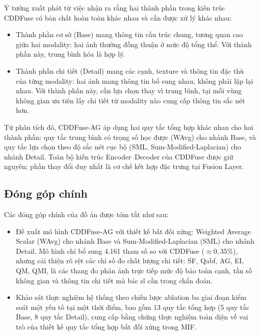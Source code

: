 Ý tưởng xuất phát từ việc nhận ra rằng hai thành phần trong kiến trúc CDDFuse có bản chất hoàn toàn khác nhau và cần được xử lý khác nhau:

\begin{itemize}\itemsep2pt
    \item Thành phần cơ sở (Base) mang thông tin cấu trúc chung, tương quan cao giữa hai modality: hai ảnh thường đồng thuận ở mức độ tổng thể. Với thành phần này, trung bình hóa là hợp lý.
    \item Thành phần chi tiết (Detail) mang các cạnh, texture và thông tin đặc thù của từng modality: hai ảnh mang thông tin bổ sung nhau, không phải lặp lại nhau. Với thành phần này, cần lựa chọn thay vì trung bình, tại mỗi vùng không gian ưu tiên lấy chi tiết từ modality nào cung cấp thông tin sắc nét hơn.
\end{itemize}

Từ phân tích đó, CDDFuse-AG áp dụng hai quy tắc tổng hợp khác nhau cho hai thành phần: quy tắc trung bình có trọng số học được (WAvg) cho nhánh Base, và quy tắc lựa chọn theo độ sắc nét cục bộ (SML, Sum-Modified-Laplacian) cho nhánh Detail. Toàn bộ kiến trúc Encoder--Decoder của CDDFuse được giữ nguyên; phần thay đổi duy nhất là cơ chế kết hợp đặc trưng tại Fusion Layer.

\subsection{Đóng góp chính}
\label{ssec:goal-contributions}

Các đóng góp chính của đồ án được tóm tắt như sau:

\begin{itemize}\itemsep4pt
    \item Đề xuất mô hình CDDFuse-AG với thiết kế bất đối xứng: Weighted Average Scalar (WAvg) cho nhánh Base và Sum-Modified-Laplacian (SML) cho nhánh Detail. Mô hình chỉ bổ sung 4.161 tham số so với CDDFuse ($\approx 0{,}35\%$), nhưng cải thiện rõ rệt các chỉ số đo chất lượng chi tiết: SF, Qabf, AG, EI, QM, QMI, là các thang đo phản ánh trực tiếp mức độ bảo toàn cạnh, tần số không gian và thông tin chi tiết mà bác sĩ cần trong chẩn đoán.

    \item Khảo sát thực nghiệm hệ thống theo chiến lược ablation ba giai đoạn kiểm soát một yếu tố tại một thời điểm, bao gồm 13 quy tắc tổng hợp (5 quy tắc Base, 8 quy tắc Detail), cung cấp bằng chứng thực nghiệm toàn diện về vai trò của thiết kế quy tắc tổng hợp bất đối xứng trong MIF.
\end{itemize}

